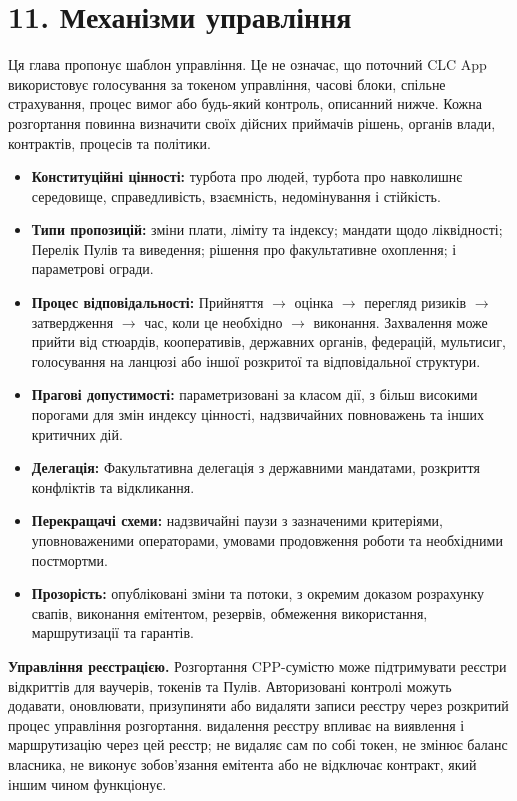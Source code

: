 \documentclass[11pt]{article}
\begin{document}
\section*{11. Механізми управління}

Ця глава пропонує шаблон управління. Це не означає, що поточний CLC App використовує голосування за токеном управління, часові блоки, спільне страхування, процес вимог або будь-який контроль, описанний нижче. Кожна розгортання повинна визначити своїх дійсних приймачів рішень, органів влади, контрактів, процесів та політики.

\begin{itemize}[leftmargin=*]
\item \textbf{Конституційні цінності:} турбота про людей, турбота про навколишнє середовище, справедливість, взаємність, недомінування і стійкість.
\item \textbf{Типи пропозицій:} зміни плати, ліміту та індексу; мандати щодо ліквідності; Перелік Пулів та виведення; рішення про факультативне охоплення; і параметрові огради.
\item \textbf{Процес відповідальності:} Прийняття $\to$ оцінка $\to$ перегляд ризиків $\to$ затвердження $\to$ час, коли це необхідно $\to$ виконання. Захвалення може прийти від стюардів, кооперативів, державних органів, федерацій, мультисиг, голосування на ланцюзі або іншої розкритої та відповідальної структури.
\item \textbf{Прагові допустимості:} параметризовані за класом дії, з більш високими порогами для змін индексу цінності, надзвичайних повноважень та інших критичних дій.
\item \textbf{Делегація:} Факультативна делегація з державними мандатами, розкриття конфліктів та відкликання.
\item \textbf{Перекращачі схеми:} надзвичайні паузи з зазначеними критеріями, уповноваженими операторами, умовами продовження роботи та необхідними постмортми.
\item \textbf{Прозорість:} опубліковані зміни та потоки, з окремим доказом розрахунку свапів, виконання емітентом, резервів, обмеження використання, маршрутизації та гарантів.
\end{itemize}
\textbf{Управління реєстрацією.} Розгортання CPP-сумістю може підтримувати реєстри відкриттів для ваучерів, токенів та Пулів. Авторизовані контролі можуть додавати, оновлювати, призупиняти або видаляти записи реєстру через розкритий процес управління розгортання. видалення реєстру впливає на виявлення і маршрутизацію через цей реєстр; не видаляє сам по собі токен, не змінює баланс власника, не виконує зобов'язання емітента або не відключає контракт, який іншим чином функціонує.
\end{document}
